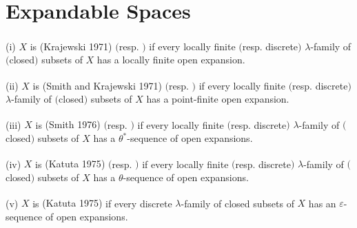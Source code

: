 \documentclass[ch3.tex]{subfiles}
\begin{document}
\section{Expandable Spaces} \label{sec:3.3}


{
\textup{(i)} $X$ is 
\textup{(\hstretch{1.8}{[}Krajewski 1971\hstretch{1.8}{]}\textsuperscript{\cite{Krajewski}})} $($resp. 
$)$ 
if every locally finite  $($resp. discrete$)$ $\lambda$-family 
of $($closed$)$ subsets of $X$ has a locally finite open expansion.

\textup{(ii)}  $X$ is 
\textup{(\hstretch{1.8}{[}Smith and Krajewski 1971\hstretch{1.8}{]}\textsuperscript{\cite{SmithKrajewski}})} $($resp. 
$)$ 
if every locally finite  $($resp. discrete$)$ $\lambda$-family 
of $($closed$)$ subsets of $X$ has a point-finite open expansion.

\textup{(iii)}  $X$ is 
\textup{(\hstretch{1.8}{[}Smith 1976\hstretch{1.8}{]}\textsuperscript{\cite{Smith1976}})} 
$($resp. 
$)$ 
if every locally finite $($resp. discrete$)$ 
$\lambda$-family of $($closed$)$ subsets of $X$ has a $\theta^*$-sequence of 
open expansions.

\textup{(iv)}  $X$ is 
\textup{(\hstretch{1.8}{[}Katuta 1975\hstretch{1.8}{]}\textsuperscript{\cite{Katuta1975}})} 
$($resp. 
$)$ 
if every locally finite $($resp. discrete$)$ 
$\lambda$-family of $($closed$)$ subsets of $X$ has a $\theta$-sequence of 
open expansions.

\textup{(v)}  $X$ is 
\textup{(\hstretch{1.8}{[}Katuta 1975\hstretch{1.8}{]}\textsuperscript{\cite{Katuta1975}})} 
if every  discrete
$\lambda$-family of closed subsets of $X$ has an $\varepsilon$-sequence of 
open expansions.
}
\end{document}
